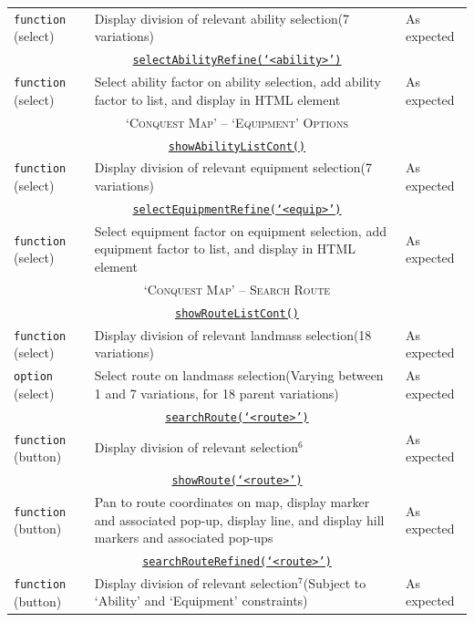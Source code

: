 \documentclass[11pt, english]{article}
\begin{document}
\begin{center}
\begin{longtable}{p{3cm}p{8cm}p{2cm}}
		\texttt{function} (select) & Display division of relevant ability selection\newline (7 variations) & As expected\\
		\multicolumn{3}{c}{\underline{\texttt{selectAbilityRefine(`<ability>')}}}\\
		\texttt{function} (select) & Select ability factor on ability selection, add ability factor to list, and display in HTML element & As expected\\
		\hline
		\multicolumn{3}{c}{\textsc{`Conquest Map' -- `Equipment' Options}}\\
		\hline
		\multicolumn{3}{c}{\underline{\texttt{showAbilityListCont()}}}\\
		\texttt{function} (select) & Display division of relevant equipment selection\newline (7 variations) & As expected\\
		\multicolumn{3}{c}{\underline{\texttt{selectEquipmentRefine(`<equip>')}}}\\
		\texttt{function} (select) & Select equipment factor on equipment selection, add equipment factor to list, and display in HTML element & As expected\\
		\hline
		\multicolumn{3}{c}{\textsc{`Conquest Map' -- Search Route}}\\
		\hline
		\multicolumn{3}{c}{\underline{\texttt{showRouteListCont()}}}\\
		\texttt{function} (select) & Display division of relevant landmass selection\newline (18 variations) & As expected\\
		\texttt{option} (select) & Select route on landmass selection\newline (Varying between 1 and 7 variations, for 18 parent variations) & As expected\\
		\multicolumn{3}{c}{\underline{\texttt{searchRoute(`<route>')}}}\\
		\texttt{function} (button) & Display division of relevant selection$^{6}$ & As expected\\
		\multicolumn{3}{c}{\underline{\texttt{showRoute(`<route>')}}}\\
		\texttt{function} (button) & Pan to route coordinates on map, display marker and associated pop-up, display line, and display hill markers and associated pop-ups & As expected\\
		\multicolumn{3}{c}{\underline{\texttt{searchRouteRefined(`<route>')}}}\\
		\texttt{function} (button) & Display division of relevant selection$^{7}$\newline (Subject to `Ability' and `Equipment' constraints) & As expected\\

\end{longtable}
\end{center}
\end{document}
